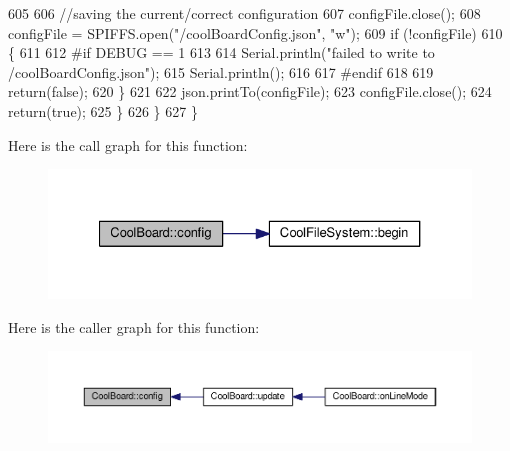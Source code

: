 \begin{DoxyCode}
605 
606             \textcolor{comment}{//saving the current/correct configuration}
607             configFile.close();
608             configFile = SPIFFS.open(\textcolor{stringliteral}{"/coolBoardConfig.json"}, \textcolor{stringliteral}{"w"});
609             \textcolor{keywordflow}{if} (!configFile)
610             \{
611             
612 \textcolor{preprocessor}{            #if DEBUG == 1}
613 
614                 Serial.println(\textcolor{stringliteral}{"failed to write to /coolBoardConfig.json"});
615                 Serial.println();
616             
617 \textcolor{preprocessor}{            #endif}
618  
619                 \textcolor{keywordflow}{return}(\textcolor{keyword}{false});
620             \}
621 
622             json.printTo(configFile);
623             configFile.close();
624             \textcolor{keywordflow}{return}(\textcolor{keyword}{true});
625         \}
626     \}
627 \}
\end{DoxyCode}
Here is the call graph for this function\+:
\nopagebreak
\begin{figure}[H]
\begin{center}
\leavevmode
\includegraphics[width=327pt]{classCoolBoard_a583a874c09c07e70a6eb9229fc4beddb_cgraph}
\end{center}
\end{figure}
Here is the caller graph for this function\+:
\nopagebreak
\begin{figure}[H]
\begin{center}
\leavevmode
\includegraphics[width=350pt]{classCoolBoard_a583a874c09c07e70a6eb9229fc4beddb_icgraph}
\end{center}
\end{figure}
\mbox{\label{classCoolBoard_a519de78b807f8ec6463ff484eb925918}} 
